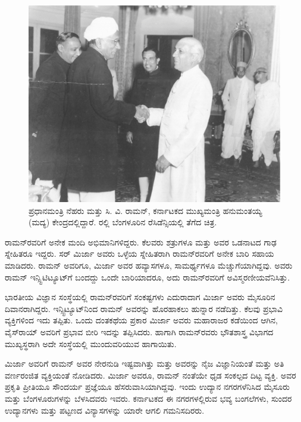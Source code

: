 \begin{figure}[!htpb]
\centering
\includegraphics[scale=0.24]{"images/10.jpg"}
\caption{ಪ್ರಧಾನಮಂತ್ರಿ ನೆಹರು ಮತ್ತು ಸಿ. ವಿ. ರಾಮನ್, ಕರ್ನಾಟಕದ ಮುಖ್ಯಮಂತ್ರಿ ಹನುಮಂತಯ್ಯ (ಮದ್ಯ) ಕೇಂದ್ರದಲ್ಲಿದ್ದಾರೆ. ರಲ್ಲಿ ಬೆಂಗಳೂರಿನ ರೆಸಿಡೆನ್ಸಿಯಲ್ಲಿ ತೆಗೆದ ಚಿತ್ರ.}\label{chap3-fig01}
\end{figure}

\newpage


ರಾಮನ್‍ರವರಿಗೆ ಅನೇಕ ಮಂದಿ ಅಭಿಮಾನಿಗಳಿದ್ದರು. ಕೆಲವರು ಶತ್ರುಗಳೂ ಮತ್ತು ಅವರ ಒಡನಾಟದ ಗಾಢ ಸ್ನೇಹಿತರೂ ಇದ್ದರು. ಸರ್ ಮಿರ್ಜಾ ಅವರು ಒಳ್ಳೆಯ ಸ್ನೇಹಿತರಾಗಿ ರಾಮನ್‍ರವರಿಗೆ ಅನೇಕ ಬಾರಿ ಸಹಾಯ ಮಾಡಿದರು. ರಾಮನ್ ಅವರಿಗೂ, ಮಿರ್ಜಾ ಅವರ ಹವ್ಯಾಸಗಳೂ, ಸಾಮರ್ಥ್ಯಗಳೂ ಮೆಚ್ಚುಗೆಯಾಗಿದ್ದವು. ಅವರು ರಾಮನ್ ಇನ್ಸ್ಟಿಟಿಟ್ಯೂಟ್‍ಗೆ ಬಂದದ್ದು ಒಂದೇ ಬಾರಿಯಾದರೂ, ಅದು ರಾಮನ್‍ರವರಿಗೆ ಅವಿಸ್ಮರಣೀಯವೆನಿಸಿತ್ತು.

ಭಾರತೀಯ ವಿಜ್ಞಾನ ಸಂಸ್ಥೆಯಲ್ಲಿ ರಾಮನ್‍ರವರಿಗೆ ಸಂಕಷ್ಟಗಳು ಎದುರಾದಾಗ ಮಿರ್ಜಾ ಅವರು ಮೈಸೂರಿನ ದಿವಾನರಾಗಿದ್ದರು. ಇನ್ಸ್ಟಿಟ್ಯೂಟ್‍ನಿಂದ ರಾಮನ್ ಅವರನ್ನು ಹೊರಹಾಕಲು ಹುನ್ನಾರ ನಡೆದಿತ್ತು. ಕೆಲವು ಪ್ರಭಾವಿ ವ್ಯಕ್ತಿಗಳಿಂದ ಇದು ತಪ್ಪಿತು. ಒಂದು ದಂತಕಥೆಯ ಪ್ರಕಾರ ಮಿರ್ಜಾ ಅವರು ಮಹಾರಾಜರ ಕಡೆಯಿಂದ ಆಗಿನ, ವೈಸ್‍ರಾಯ್ ಅವರಿಗೆ ಪ್ರಭಾವ ಬೀರಿ ಇದನ್ನು ತಪ್ಪಿಸಿದರು. ಹಾಗಾಗಿ ರಾಮನ್‍ರವರು ಭೌತಶಾಸ್ತ್ರ ವಿಭಾಗದ ಮುಖ್ಯಸ್ಥರಾಗಿ ಅದೇ ಸಂಸ್ಥೆಯಲ್ಲಿ ಮುಂದುವರಿಯುವ ಹಾಗಾಯಿತು.

ಮಿರ್ಜಾ ಅವರಿಗೆ ರಾಮನ್ ಅವರ ನೇರನುಡಿ ಇಷ್ಟವಾಗಿತ್ತು ಮತ್ತು ಅವರನ್ನು ನೈಜ ವಿಜ್ಞಾನಿಯಂತೆ ಮತ್ತು ಅತಿ ವರ್ಣರಂಜಿತ ವ್ಯಕ್ತಿಯಂತೆ ನೋಡಿದರು. ಮಿರ್ಜಾ ಅವರೂ, ರಾಮನ್ ನಂತೆಯೇ ಧೃಡ ಸಂಕಲ್ಪದ ದಿಟ್ಟ ವ್ಯಕ್ತಿ. ಅವರ ಪ್ರಕೃತಿ ಪ್ರೀತಿಯೂ ಸೌಂದರ್ಯ ಪ್ರಜ್ಞೆಯೂ ಹೆಸರುವಾಸಿಯಾಗಿದ್ದವು. ಇಂದು ಉದ್ಯಾನ ನಗರಗಳೆನಿಸಿದ ಮೈಸೂರು ಮತ್ತು ಬೆಂಗಳೂರುಗಳನ್ನು ಬೆಳಸಿದವರು ಇವರು. ಕರ್ನಾಟಕದ ಈ ನಗರಗಳಲ್ಲಿರುವ ಭವ್ಯ ಬಂಗಲೆಗಳು, ಸುಂದರ ಉದ್ಯಾನಗಳು ಮತ್ತು ಪಟ್ಟಣದ ವಿನ್ಯಾಸಗಳನ್ನು ಯಾರೇ ಆಗಲಿ ಗಮನಿಸದಿರರು.


